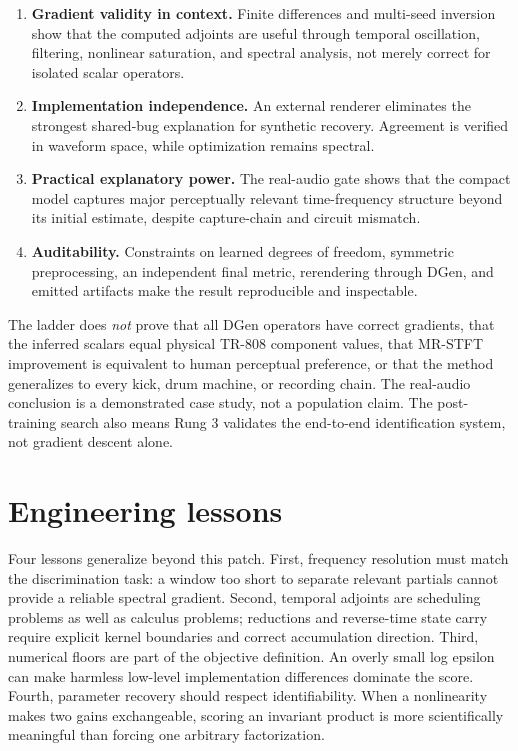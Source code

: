 \documentclass[10pt]{article}
\begin{document}
\begin{enumerate}
  \item \textbf{Gradient validity in context.} Finite differences and multi-seed inversion show that the computed adjoints are useful through temporal oscillation, filtering, nonlinear saturation, and spectral analysis, not merely correct for isolated scalar operators.
  \item \textbf{Implementation independence.} An external renderer eliminates the strongest shared-bug explanation for synthetic recovery. Agreement is verified in waveform space, while optimization remains spectral.
  \item \textbf{Practical explanatory power.} The real-audio gate shows that the compact model captures major perceptually relevant time-frequency structure beyond its initial estimate, despite capture-chain and circuit mismatch.
  \item \textbf{Auditability.} Constraints on learned degrees of freedom, symmetric preprocessing, an independent final metric, rerendering through DGen, and emitted artifacts make the result reproducible and inspectable.
\end{enumerate}

The ladder does \emph{not} prove that all DGen operators have correct gradients, that the inferred scalars equal physical TR-808 component values, that MR-STFT improvement is equivalent to human perceptual preference, or that the method generalizes to every kick, drum machine, or recording chain. The real-audio conclusion is a demonstrated case study, not a population claim. The post-training search also means Rung 3 validates the end-to-end identification system, not gradient descent alone.

\section{Engineering lessons}

Four lessons generalize beyond this patch. First, frequency resolution must match the discrimination task: a window too short to separate relevant partials cannot provide a reliable spectral gradient. Second, temporal adjoints are scheduling problems as well as calculus problems; reductions and reverse-time state carry require explicit kernel boundaries and correct accumulation direction. Third, numerical floors are part of the objective definition. An overly small log epsilon can make harmless low-level implementation differences dominate the score. Fourth, parameter recovery should respect identifiability. When a nonlinearity makes two gains exchangeable, scoring an invariant product is more scientifically meaningful than forcing one arbitrary factorization.
\end{document}
